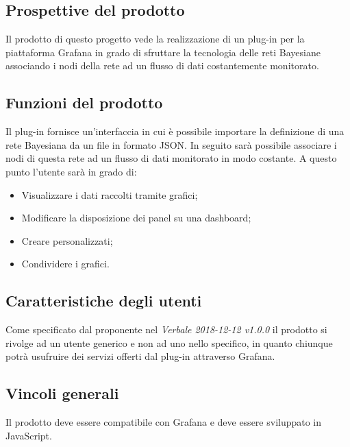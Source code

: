 
\subsection{Prospettive del prodotto}
Il prodotto di questo progetto vede la realizzazione di un plug-in per la piattaforma Grafana in grado di sfruttare la tecnologia delle reti Bayesiane associando i nodi della rete ad un flusso di dati costantemente monitorato.

\subsection{Funzioni del prodotto}
Il plug-in fornisce un'interfaccia in cui è possibile importare la definizione di una rete Bayesiana da un file in formato JSON. In seguito sarà possibile associare i nodi di questa rete ad un flusso di dati monitorato in modo costante. A questo punto l'utente sarà in grado di:
\begin{itemize}
	\item Visualizzare i dati raccolti tramite grafici;
	\item Modificare la disposizione dei panel su una dashboard;
	\item Creare  personalizzati;
	\item Condividere i grafici.
\end{itemize}

\subsection{Caratteristiche degli utenti}
Come specificato dal proponente nel \emph{Verbale 2018-12-12 v1.0.0} il prodotto si rivolge ad un utente generico e non ad uno nello specifico, in quanto chiunque potrà usufruire dei servizi offerti dal plug-in attraverso Grafana. 

\subsection{Vincoli generali}
Il prodotto deve essere compatibile con Grafana e deve essere sviluppato in JavaScript.

\pagebreak